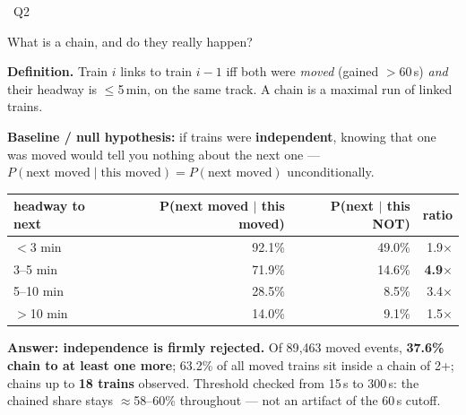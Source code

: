 \documentclass[aspectratio=169,10pt]{beamer}
\newcommand{\srcnote}[1]{{\scriptsize\color{ink3}#1}}
\newcommand{\qtag}[1]{{\scriptsize\color{surface}\colorbox{cblue}{\strut~Q#1~}}}
\begin{document}
\begin{frame}{\qtag{2} What is a chain, and do they really happen?}
  \textbf{Definition.} Train $i$ links to train $i{-}1$ iff both were
  \emph{moved} (gained $>$60\,s) \emph{and} their headway is $\leq$5\,min, on the
  same track. A chain is a maximal run of linked trains.

  \vspace{0.4em}
  \textbf{Baseline / null hypothesis:} if trains were \textbf{independent}, knowing
  that one was moved would tell you nothing about the next one --- $P(\text{next
  moved}\mid\text{this moved}) = P(\text{next moved})$ unconditionally.

  \vspace{0.6em}
  \centering
  \begin{tabular}{@{}lrrr@{}}
    \toprule
    headway to next & P(next moved $\mid$ this moved) & P(next $\mid$ this NOT) & ratio \\
    \midrule
    $<$3 min & 92.1\% & 49.0\% & 1.9$\times$ \\
    3--5 min & 71.9\% & 14.6\% & \textbf{4.9$\times$} \\
    5--10 min & 28.5\% & 8.5\% & 3.4$\times$ \\
    $>$10 min & 14.0\% & 9.1\% & 1.5$\times$ \\
    \bottomrule
  \end{tabular}

  \vspace{0.6em}
  \textbf{Answer: independence is firmly rejected.} Of 89{,}463 moved events,
  \textbf{37.6\% chain to at least one more}; 63.2\% of all moved trains sit inside
  a chain of 2+; chains up to \textbf{18 trains} observed.
  \srcnote{Threshold checked from 15\,s to 300\,s: the chained share stays
  $\approx$58--60\% throughout --- not an artifact of the 60\,s cutoff.}
\end{frame}
\end{document}
